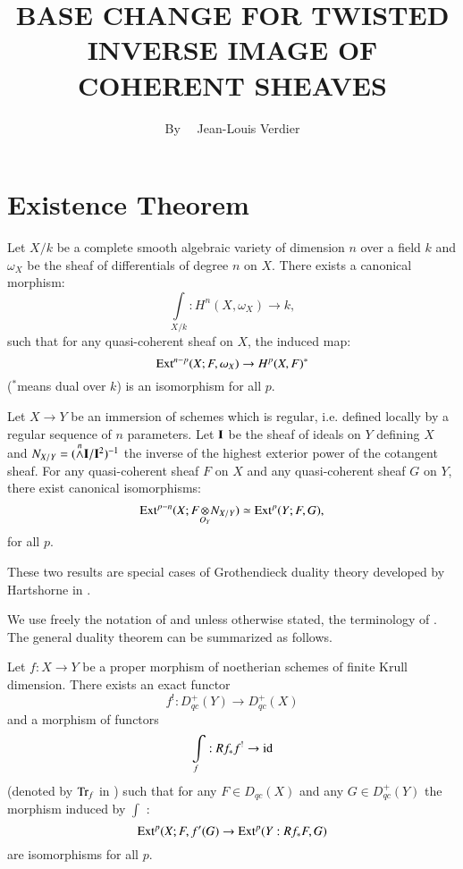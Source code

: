 \title{BASE CHANGE FOR TWISTED INVERSE IMAGE OF COHERENT SHEAVES}

\author{By~~ Jean-Louis Verdier}
\date{}

\maketitle

\setcounter{pageoriginal}{392}
\section{Existence Theorem}\label{art20-sec1}
\pageoriginale
Let $X/k$ be a complete smooth algebraic variety of dimension $n$ over a field $k$ and $\omega_{X}$ be the sheaf of differentials of degree $n$ on $X$. There exists a canonical morphism:
$$
\int\limits_{X/k}:H^{n}(X,\omega_{X})\to k,
$$
such that for any quasi-coherent sheaf on $X$, the induced map:
$$
\operatorname{\mathrm{Ext}}^{n-p}(X;F,\omega_{X})\to H^{p}(X,F)^{*}
$$
($^{*}$means dual over $k$) is an isomorphism for all $p$.

Let $X\to Y$ be an immersion of schemes which is regular, i.e. defined locally by a regular sequence of $n$ parameters. Let $\mathbf{I}$ be the sheaf of ideals on $Y$ defining $X$ and $N_{X/Y}=({\displaystyle{\mathop{\wedge}\limits^{n}}}\mathbf{I}/\mathbf{I}^{2})^{-1}$ the inverse of the highest exterior power of the cotangent sheaf. For any quasi-coherent sheaf $F$ on $X$ and any quasi-coherent sheaf $G$ on $Y$, there exist canonical isomorphisms:
$$
\Ext^{p-n}(X;\foprod{F}{N_{X/Y}}{O_{Y}})\simeq \Ext^{p}(Y;F,G),
$$
for all $p$.

These two results are special cases of Grothendieck duality theory developed by Hartshorne in \cite{art01-key1}.

We use freely the notation of \cite{art20-key1} and unless otherwise stated, the terminology of \cite{art20-key1}. The general duality theorem can be summarized as follows.

\begin{theorem}\label{art20-thm1}
Let $f:X\to Y$ be a proper morphism of noetherian schemes of finite Krull dimension. There exists an exact functor
$$
f^{!}:D^{+}_{qc}(Y)\to D^{+}_{qc}(X)
$$
and a morphism of functors
$$
\int\limits_{f}:Rf_{*}f^{!}\to \operatorname{\mathrm{id}}
$$\pageoriginale
(denoted by $\operatorname{\mathrm{Tr}}_{f}$ in \cite{art20-key1}) such that for any $F\in D_{qc}(X)$ and any $G\in D^{+}_{qc}(Y)$ the morphism induced by $\int$ :
$$
\operatorname{\mathrm{Ext}}^{p}(X;F,f'(G)\to \operatorname{\mathrm{Ext}}^{p}(Y:Rf_{*}F,G)
$$
are isomorphisms for all $p$.
\end{theorem}

